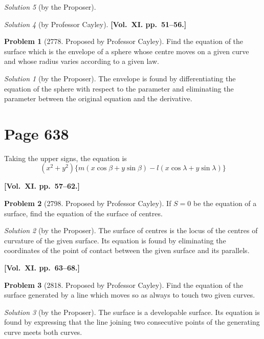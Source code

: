 \documentclass[12pt,a4paper]{article}
\theoremstyle{plain}
\theoremstyle{definition}
\newtheorem{problem}{Problem}
\theoremstyle{remark}
\newtheorem*{solution}{Solution}
\begin{document}
\begin{solution}[by the Proposer]
\begin{solution}[by Professor Cayley]
\medskip\noindent\textbf{[Vol.~XI. pp.~51--56.]}

\begin{problem}[2778. Proposed by Professor Cayley]
Find the equation of the surface which is the envelope of a sphere whose centre moves on a given curve and whose radius varies according to a given law.
\end{problem}

\begin{solution}[by the Proposer]
The envelope is found by differentiating the equation of the sphere with respect to the parameter and eliminating the parameter between the original equation and the derivative.
\end{solution}

\section*{Page 638}
\setcounter{page}{638}

Taking the upper signs, the equation is
\[
(x^2 + y^2)\{m(x\cos\beta + y\sin\beta) - l(x\cos\lambda + y\sin\lambda)\}
\]

\medskip\noindent\textbf{[Vol.~XI. pp.~57--62.]}

\begin{problem}[2798. Proposed by Professor Cayley]
If $S = 0$ be the equation of a surface, find the equation of the surface of centres.
\end{problem}

\begin{solution}[by the Proposer]
The surface of centres is the locus of the centres of curvature of the given surface. Its equation is found by eliminating the coordinates of the point of contact between the given surface and its parallels.
\end{solution}

\medskip\noindent\textbf{[Vol.~XI. pp.~63--68.]}

\begin{problem}[2818. Proposed by Professor Cayley]
Find the equation of the surface generated by a line which moves so as always to touch two given curves.
\end{problem}

\begin{solution}[by the Proposer]
The surface is a developable surface. Its equation is found by expressing that the line joining two consecutive points of the generating curve meets both curves.
\end{solution}


\end{solution}
\end{solution}
\end{document}
